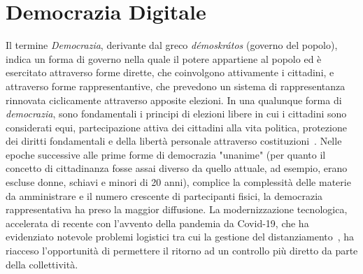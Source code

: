 \documentclass[12pt,a4paper,openright,twoside]{book}
\begin{document}
\chapter{Democrazia Digitale}
Il termine \textit{Democrazia}, derivante dal greco \textit{démoskrátos} (governo del popolo),
indica un forma di governo nella quale il potere appartiene al popolo ed è esercitato attraverso forme dirette, che coinvolgono attivamente
i cittadini, e attraverso forme rappresentantive, che prevedono un sistema di rappresentanza rinnovata ciclicamente
attraverso apposite elezioni.
In una qualunque forma di \textit{democrazia}, sono fondamentali i principi di elezioni libere in cui i cittadini sono considerati equi, partecipazione
attiva dei cittadini alla vita politica, protezione dei diritti fondamentali e della libertà personale attraverso costituzioni~\cite{vinod2017state}.
Nelle epoche successive alle prime forme di democrazia "unanime" (per quanto il concetto di cittadinanza fosse assai diverso da quello attuale,
ad esempio, erano escluse donne, schiavi e minori di 20 anni), complice la complessità
delle materie da amministrare e il numero crescente di partecipanti fisici, la democrazia
rappresentativa ha preso la maggior diffusione. 
La modernizzazione tecnologica, accelerata di recente con l'avvento della pandemia da Covid-19, che ha evidenziato notevole problemi
logistici tra cui la gestione del distanziamento~\cite{sotoacosta}, ha riacceso l'opportunità di
permettere il ritorno ad un controllo più diretto da parte della collettività.
\end{document}
